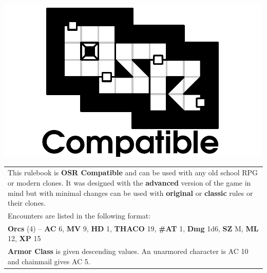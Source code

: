 \documentclass[9pt,twoside]{book}
\begin{document}
\begin{center}
\vspace{2cm}

\begin{minipage}{0.85\textwidth}

\begin{center}

\noindent\includegraphics[scale=0.6]{OSR.pdf}

\end{center}

\noindent \begin{tabular}{|p{\textwidth}|}

\hline
\normalsize This rulebook is \textbf{OSR Compatible} and can be used with any old school RPG or modern clones. It was designed with the \textbf{advanced} version of the game in mind but with minimal changes can be used with \textbf{original} or \textbf{classic} rules or their clones. \\
\normalsize Encounters are listed in the following format: \\
\normalsize \hspace{2em} \textbf{Orcs} (4) -- \textbf{AC} 6, \textbf{MV} 9, \textbf{HD} 1, \textbf{THACO} 19, \textbf{\#AT} 1, \textbf{Dmg} 1d6, \textbf{SZ} M, \textbf{ML} 12, \textbf{XP} 15 \\
\normalsize \textbf{Armor Class} is given descending values. An unarmored character is AC 10 and chainmail gives AC 5. \\
\hline
\end{tabular}

\end{minipage}

\end{center} 

\newpage

\thispagestyle{empty}
\end{document}
